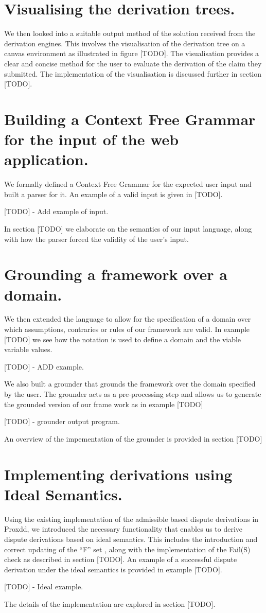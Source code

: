 \section{Visualising the derivation trees.}

We then looked into a suitable output method of the solution received from the derivation engines. This involves the visualisation of the derivation tree on a canvas environment as illustrated in figure [TODO]. The visualisation provides a clear and concise method for the user to evaluate the derivation of the claim they submitted. The implementation of the visualisation is discussed further in section [TODO].

\section{Building a Context Free Grammar for the input of the web application.}

We formally defined a Context Free Grammar for the expected user input and built a parser for it. An example of a valid input is given in [TODO].

[TODO] - Add example of input.

In section [TODO] we elaborate on the semantics of our input language, along with how the parser forced the validity of the user's input.

\section{Grounding a framework over a domain.}

We then extended the language to allow for the specification of a domain over which assumptions, contraries or rules of our framework are valid. In example [TODO] we see how the notation is used to define a domain and the viable variable values.

[TODO] - ADD example.

We also built a grounder that grounds the framework over the domain specified by the user. The grounder acts as a pre-processing step and allows us to generate the grounded version of our frame work as in example [TODO]

[TODO] - grounder output program.

An overview of the impementation of the grounder is provided in section [TODO]

\section{Implementing derivations using Ideal Semantics.}

Using the existing implementation of the admissible based dispute derivations in Proxdd, we introduced the necessary functionality that enables us to derive dispute derivations based on ideal semantics. This includes the introduction and correct updating of the ``F'' set , along with the implementation of the Fail(S) check as described in section [TODO]. An example of a successful dispute derivation under the ideal semantics is provided in example [TODO].

[TODO] - Ideal example.

The details of the implementation are explored in section [TODO].